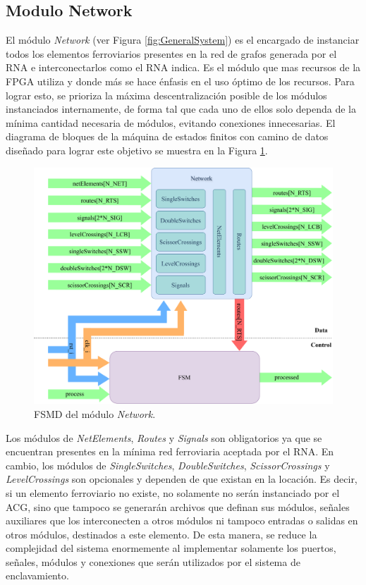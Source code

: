 \subsection{Modulo Network}
	\label{sec:network}
	
	El módulo \textit{Network} (ver Figura \ref{fig:GeneralSystem}) es el encargado de instanciar todos los elementos ferroviarios presentes en la red de grafos generada por el RNA e interconectarlos como el RNA indica. Es el módulo que mas recursos de la FPGA utiliza y donde más se hace énfasis en el uso óptimo de los recursos. Para lograr esto, se prioriza la máxima descentralización posible de los módulos instanciados internamente, de forma tal que cada uno de ellos solo dependa de la mínima cantidad necesaria de módulos, evitando conexiones innecesarias. El diagrama de bloques de la máquina de estados finitos con camino de datos diseñado para lograr este objetivo se muestra en la Figura \ref{fig:Network_module}.
	
	\begin{figure}[H]
		\centering
		\includegraphics[width=1\textwidth]{Figuras/Network_module.png}
		\centering\caption{FSMD del módulo \textit{Network}.}
		\label{fig:Network_module}
	\end{figure}
	
	Los módulos de \textit{NetElements}, \textit{Routes} y \textit{Signals} son obligatorios ya que se encuentran presentes en la mínima red ferroviaria aceptada por el RNA. En cambio, los módulos de \textit{SingleSwitches}, \textit{DoubleSwitches}, \textit{ScissorCrossings} y \textit{LevelCrossings} son opcionales y dependen de que existan en la locación. Es decir, si un elemento ferroviario no existe, no solamente no serán instanciado por el ACG, sino que tampoco se generarán archivos que definan sus módulos, señales auxiliares que los interconecten a otros módulos ni tampoco entradas o salidas en otros módulos, destinados a este elemento. De esta manera, se reduce la complejidad del sistema enormemente al implementar solamente los puertos, señales, módulos y conexiones que serán utilizados por el sistema de enclavamiento.
	
